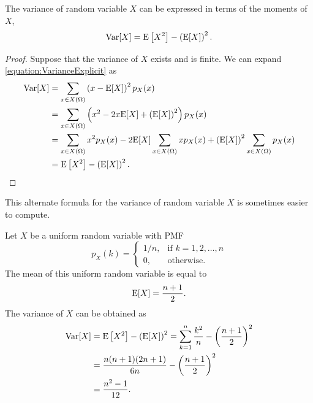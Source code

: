 \begin{theorem}
The variance of random variable $X$ can be expressed in terms of the moments of $X$,
\begin{equation*}
\mathrm{Var} [X] = \mathrm{E} \left[ X^2 \right] - \left( \mathrm{E} [X] \right)^2.
\end{equation*}
\end{theorem}
\begin{proof}
Suppose that the variance of $X$ exists and is finite.
We can expand \eqref{equation:VarianceExplicit} as
\begin{equation*}
\begin{split}
\mathrm{Var} [X] &= \sum_{x \in X(\Omega)} \left( x - \mathrm{E} [X] \right)^2 p_X (x) \\
&= \sum_{x \in X(\Omega)} \left( x^2 - 2 x \mathrm{E} [X] + \left( \mathrm{E} [X] \right)^2 \right) p_X (x) \\
&= \sum_{x \in X(\Omega)} x^2 p_X (x) - 2 \mathrm{E} [X] \sum_{x \in X(\Omega)} x p_X (x) + \left( \mathrm{E} [X] \right)^2 \sum_{x \in X(\Omega)} p_X (x) \\
&= \mathrm{E} \left[ X^2 \right] - \left( \mathrm{E} [X] \right)^2.
\end{split}
\end{equation*}
\end{proof}

This alternate formula for the variance of random variable $X$ is sometimes easier to compute.

\begin{example}
Let $X$ be a uniform random variable with PMF
\begin{equation*}
p_X (k) = \left\{ \begin{array}{ll}
1/n, & \text{if }k = 1, 2, \ldots, n \\
0, & \text{otherwise} .
\end{array} \right.
\end{equation*}
The mean of this uniform random variable is equal to
\begin{equation*}
\mathrm{E} [X] = \frac{n+1}{2} .
\end{equation*}
The variance of $X$ can be obtained as
\begin{equation*}
\begin{split}
\mathrm{Var} [X] &= \mathrm{E} \left[ X^2 \right] - \left( \mathrm{E} [X] \right)^2
= \sum_{k=1}^n \frac{k^2}{n} - \left( \frac{n+1}{2} \right)^2 \\
&= \frac{n(n+1)(2n+1)}{6n} - \left( \frac{n+1}{2} \right)^2 \\
&= \frac{n^2 - 1}{12} .
\end{split}
\end{equation*}
\end{example}

